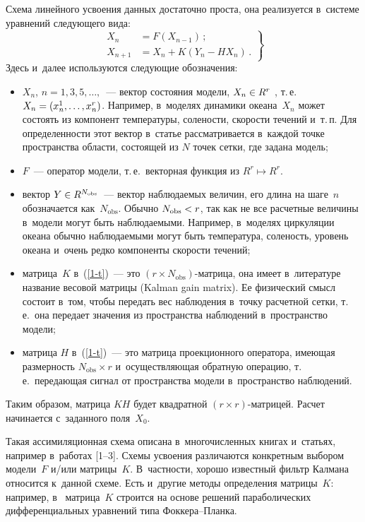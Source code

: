 \begin{multicols}{2}
Схема линейного усвоения данных достаточно проста, она реализуется в~системе уравнений следующего вида:
\begin{equation}
\left.
\begin{array}{rl}
X_n&=F\left(X_{n-1}\right)\,;\\[6pt]
X_{n+1}&=X_n+K\left(Y_n-HX_n\right)\,.
\end{array}
\right\}
\label{1-t}
\end{equation}
Здесь и~далее используются следующие обозначения:
\begin{itemize}
\item $X_n$, $n=1,3,5,\ldots,$~--- вектор состояния модели,
 $X_n \hm\in R^r$ , т.\,е.\ $X_n\hm=(x^1_n,\ldots ,x^r_n)$.
 Например, в~моделях динамики океана~$X_n$ может состоять из
 компонент температуры, солености, ско\-рости течений и~т.\,п.
 Для определенности этот вектор в~статье рассматривается в~каждой
 точке пространства области, состоящей из $N$ точек сетки, где задана модель;
 \item $F$~--- оператор модели, т.\,е.\ векторная функция из $R^r \mapsto R^r$.
\item  вектор $Y \hm\in R^{N_{\mathrm{obs}}}$~--- вектор наблюдаемых величин,
его длина на шаге~$n$ обозначается как~$N_{\mathrm{obs}}$.
Обычно $N_{\mathrm{obs}}\hm<r$, так как не все расчетные величины
в~модели могут быть наблюдаемыми. Например, в~моделях циркуляции океана
обычно наблюдаемыми могут быть температура, соленость, уровень океана и~очень
редко компоненты скорости течений;
\item матрица~$K$ в~(\ref{1-t})~--- это $(r\times N_{\mathrm{obs}})$-мат\-ри\-ца,
она имеет в~литературе название весовой матрицы (Kalman gain matrix).
Ее физический смысл состоит в~том, чтобы передать вес наблюдения в~точку
расчетной сетки, т.\,е.\ она передает значения из пространства наблюдений
в~пространство модели;
\item матрица $H$ в~(\ref{1-t})~--- это матрица проекционного оператора,
имеющая размерность $N_{\mathrm{obs}} \times r$ и~осуществляющая обратную операцию,
т.\,е.\ передающая сигнал от пространства модели в~пространство наблюдений.
\end{itemize}

 Таким образом, матрица $KH$ будет квадратной $(r \times r)$-мат\-ри\-цей.
 Расчет начинается с~заданного поля~$X_0$.

Такая ассимиляционная схема описана в~многочисленных книгах и~статьях,
например в~работах [1--3]. Схемы усвоения различаются конкретным выбором модели~$F$
и/или матрицы~$K$. В~частности, хорошо известный фильтр Калмана~\cite{Evensen2}
относится к~данной схеме. Есть и~другие методы определения матрицы~$K$:
например, в~\cite{Belyaev1} матрица~$K$ строится на основе
решений параболических дифференциальных уравнений типа Фок\-ке\-ра--Планка.


\end{multicols}

